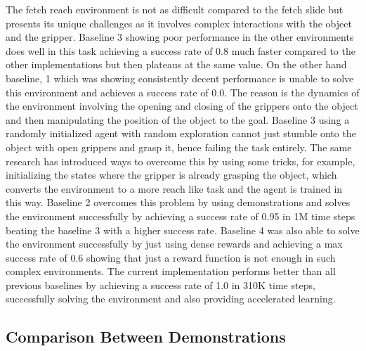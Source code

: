 The fetch reach environment is not as difficult compared to the fetch slide but presents its unique challenges as it involves complex interactions with the object and the gripper. Baseline 3 showing poor performance in the other environments does well in this task achieving a success rate of 0.8 much faster compared to the other implementations but then plateaus at the same value. On the other hand baseline, 1 which was showing consistently decent performance is unable to solve this environment and achieves a success rate of 0.0. The reason is the dynamics of the environment involving the opening and closing of the grippers onto the object and then manipulating the position of the object to the goal. Baseline 3 using a randomly initialized agent with random exploration cannot just stumble onto the object with open grippers and grasp it, hence failing the task entirely. The same research has introduced ways to overcome this by using some tricks, for example, initializing the states where the gripper is already grasping the object, which converts the environment to a more reach like task and the agent is trained in this way.  Baseline 2 overcomes this problem by using demonstrations and solves the environment successfully by achieving a success rate of 0.95 in 1M time steps beating the baseline 3 with a higher success rate. Baseline 4 was also able to solve the environment successfully by just using dense rewards and achieving a max success rate of 0.6 showing that just a reward function is not enough in such complex environments. The current implementation performs better than all previous baselines by achieving a success rate of 1.0 in 310K time steps, successfully solving the environment and also providing accelerated learning. \\

\subsection{Comparison Between Demonstrations}

